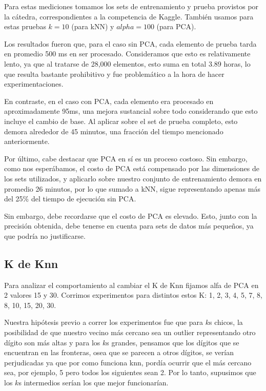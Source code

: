 Para estas mediciones tomamos los sets de entrenamiento y prueba provistos por la cátedra, correspondientes a la competencia de Kaggle. También usamos para estas pruebas $k = 10$ (para kNN) y $alpha = 100$ (para PCA). 

Los resultados fueron que, para el caso sin PCA, cada elemento de prueba tarda en promedio 500 ms en ser procesado. Consideramos que esto es relativamente lento, ya que al tratarse de 28,000 elementos, esto suma en total 3.89 horas, lo que resulta bastante prohibitivo y fue problemático a la hora de hacer experimentaciones.

En contraste, en el caso con PCA, cada elemento era procesado en aproximadamente 95ms, una mejora sustancial sobre todo considerando que esto incluye el cambio de base. Al aplicar sobre el set de prueba completo, esto demora alrededor de 45 minutos, una fracción del tiempo mencionado anteriormente.

Por último, cabe destacar que PCA en sí es un proceso costoso. Sin embargo, como nos esperábamos, el costo de PCA está compensado por las dimensiones de los sets utilizados, y aplicarlo sobre nuestro conjunto de entrenamiento demora en promedio 26 minutos, por lo que sumado a kNN, sigue representando apenas más del 25\% del tiempo de ejecución sin PCA.

Sin embargo, debe recordarse que el costo de PCA es elevado. Esto, junto con la precisión obtenida, debe tenerse en cuenta para sets de datos más pequeños, ya que podría no justificarse.

\subsection{K de Knn}

Para analizar el comportamiento al cambiar el K de Knn fijamos alfa de PCA en 2 valores 15 y 30. Corrimos experimentos para distintos estos K: 1, 2, 3, 4, 5, 7, 8, 8, 10, 15, 20, 30.

Nuestra hipótesis previo a correr los experimentos fue que para $k$s chicos, la posibilidad de que nuestro vecino más cercano sea un outlier representando otro dígito son más altas y para los $k$s grandes, pensamos que los dígitos que se encuentran en las fronteras, osea que se parecen a otros dígitos, se verían perjudicadas ya que por como funciona knn, pordía ocurrir que el más cercano sea, por ejemplo, 5 pero todos los siguientes sean 2. Por lo tanto, supusimos que los $k$s intermedios serían los que mejor funcionarían.


